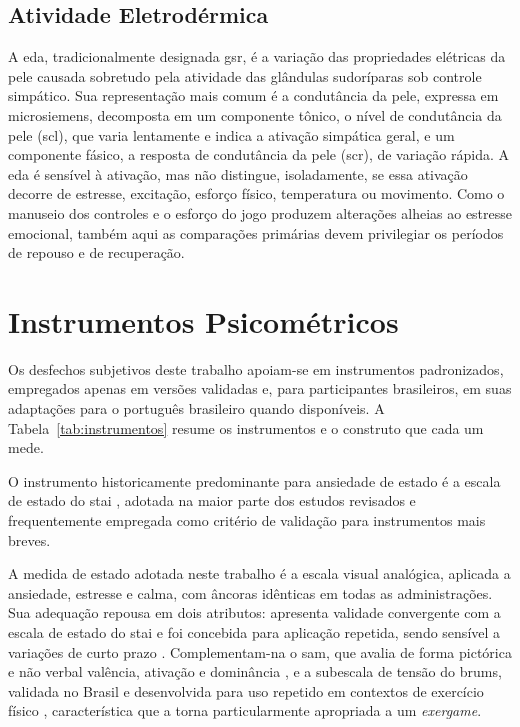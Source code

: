\subsection{Atividade Eletrodérmica}\label{subsec:fund-eda}

A \gls{eda}, tradicionalmente designada \gls{gsr}, é a variação das propriedades elétricas da pele causada sobretudo pela atividade das glândulas sudoríparas sob controle simpático. Sua representação mais comum é a condutância da pele, expressa em microsiemens, decomposta em um componente tônico, o nível de condutância da pele (\gls{scl}), que varia lentamente e indica a ativação simpática geral, e um componente fásico, a resposta de condutância da pele (\gls{scr}), de variação rápida. A \gls{eda} é sensível à ativação, mas não distingue, isoladamente, se essa ativação decorre de estresse, excitação, esforço físico, temperatura ou movimento. Como o manuseio dos controles e o esforço do jogo produzem alterações alheias ao estresse emocional, também aqui as comparações primárias devem privilegiar os períodos de repouso e de recuperação.

\section{Instrumentos Psicométricos}\label{sec:fund-instrumentos}

Os desfechos subjetivos deste trabalho apoiam-se em instrumentos padronizados, empregados apenas em versões validadas e, para participantes brasileiros, em suas adaptações para o português brasileiro quando disponíveis. A Tabela~\ref{tab:instrumentos} resume os instrumentos e o construto que cada um mede.

O instrumento historicamente predominante para ansiedade de estado é a escala de estado do \gls{stai} \citep{Spielberger1983}, adotada na maior parte dos estudos revisados e frequentemente empregada como critério de validação para instrumentos mais breves.

A medida de estado adotada neste trabalho é a escala visual analógica, aplicada a ansiedade, estresse e calma, com âncoras idênticas em todas as administrações. Sua adequação repousa em dois atributos: apresenta validade convergente com a escala de estado do \gls{stai} e foi concebida para aplicação repetida, sendo sensível a variações de curto prazo \citep{Facco2011}. Complementam-na o \gls{sam}, que avalia de forma pictórica e não verbal valência, ativação e dominância \citep{BradleyLang1994}, e a subescala de tensão do \gls{brums}, validada no Brasil e desenvolvida para uso repetido em contextos de exercício físico \citep{Rohlfs2008}, característica que a torna particularmente apropriada a um \textit{exergame}.

